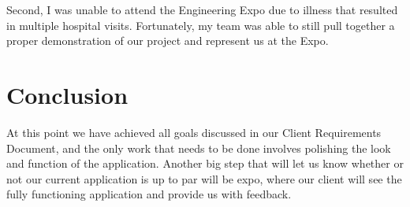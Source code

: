 \documentclass[letterpaper, 10pt,titlepage]{article}
\begin{document}
Second, I was unable to attend the Engineering Expo due to illness that resulted in multiple hospital visits. Fortunately, my team was able to still pull together a proper demonstration of our project and represent us at the Expo. 

\vspace{0.5cm}

\section{Conclusion}
At this point we have achieved all goals discussed in our Client Requirements Document, and the only work that needs to be done involves polishing the look and function of the application. Another big step that will let us know whether or not our current application is up to par will be expo, where our client will see the fully functioning application and provide us with feedback.
\end{document}
